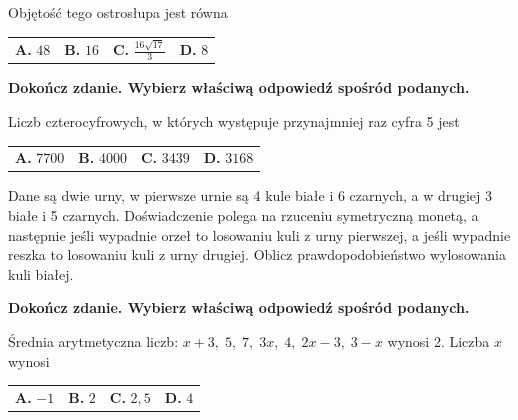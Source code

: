 \documentclass[12pt,a4paper]{article}
\theoremstyle{break}
\begin{document}
	Objętość tego ostrosłupa jest równa
	
	\vspace{0.5cm}
	\begin{tabular}{p{3.5cm} p{3.5cm} p{3.5cm} p{3.5cm}}
		\textbf{A. }$48$&
		\textbf{B. }$16$&
		\textbf{C. }$\frac{16\sqrt{17}}{3}$&
		\textbf{D. }$8$\\
	\end{tabular}

	\begin{zad}[0-1]
		\textbf{Dokończ zdanie. Wybierz właściwą odpowiedź spośród podanych.}
	\end{zad} 
	
	Liczb czterocyfrowych, w których występuje przynajmniej raz cyfra 5 jest
	
	\vspace{0.5cm}
	\begin{tabular}{p{3.5cm} p{3.5cm} p{3.5cm} p{3.5cm}}
		\textbf{A. }$7700$&
		\textbf{B. }$4000$&
		\textbf{C. }$3439$&
		\textbf{D. }$3168$\\
	\end{tabular}


	\begin{zad}[0-2]
		Dane są dwie urny, w pierwsze urnie są 4 kule białe i 6 czarnych, a w drugiej 3 białe i 5 czarnych. Doświadczenie polega na rzuceniu symetryczną monetą, a następnie jeśli wypadnie orzeł to losowaniu kuli z urny pierwszej, a jeśli wypadnie reszka to losowaniu kuli z urny drugiej. Oblicz prawdopodobieństwo wylosowania kuli białej.
	\end{zad} 
	
	
	\begin{zad}[0-1]
		\textbf{Dokończ zdanie. Wybierz właściwą odpowiedź spośród podanych.}
	\end{zad} 
	
	Średnia arytmetyczna liczb: $x+3,\;5,\;7,\;3x,\;4,\;2x-3,\;3-x$ wynosi 2. Liczba $x$ wynosi
	
	\vspace{0.5cm}
	\begin{tabular}{p{3.5cm} p{3.5cm} p{3.5cm} p{3.5cm}}
		\textbf{A. }$-1$&
		\textbf{B. }$2$&
		\textbf{C. }$2,5$&
		\textbf{D. }$4$\\
	\end{tabular}
	
\end{document}
